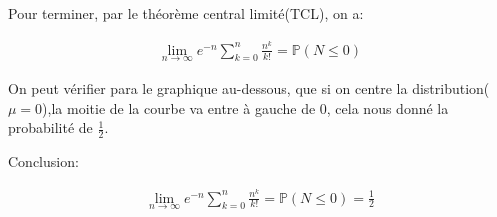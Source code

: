 \documentclass[a4paper]{article}
\begin{document}
Pour terminer, par le théorème central limité(TCL), on a:

\begin{eqnarray*}
 \lim_{n\rightarrow\infty} e^{-n}\sum_{k=0}^n\frac{n^k}{k!}=\mathbb{P}(N\leq 0)
\end{eqnarray*}

On  peut   vérifier  para  le  graphique   au-dessous,  que  si   on  centre  la
distribution($\mu=0$),la moitie de  la courbe va entre à gauche  de 0, cela nous
donné la probabilité de $\frac{1}{2}$.

\begin{center}
\end{center}

Conclusion:

\begin{eqnarray*}
 \lim_{n\rightarrow\infty} e^{-n}\sum_{k=0}^n\frac{n^k}{k!}=\mathbb{P}(N\leq 0)=\frac{1}{2}
\end{eqnarray*}
\end{document}
